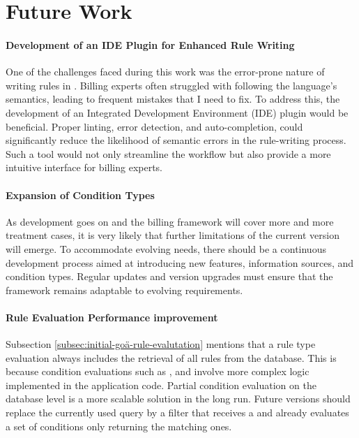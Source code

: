 \section{Future Work}\label{sec:future-work}

\paragraph{Development of an IDE Plugin for Enhanced Rule Writing}
One of the challenges faced during this work was the error-prone nature of writing rules in \RF.
Billing experts often struggled with following the language's semantics, leading to frequent mistakes that I need to fix.
To address this, the development of an Integrated Development Environment (IDE) plugin would be beneficial.
Proper linting, error detection, and  auto-completion, could significantly reduce the likelihood of semantic errors
in the rule-writing process.
Such a tool would not only streamline the workflow but also provide a more intuitive interface for billing experts.

\paragraph{Expansion of Condition Types}
As development goes on and the billing framework will cover more and more treatment cases,
it is very likely that further limitations of the current version will emerge.
To accommodate evolving needs, there should be a continuous development process aimed at introducing new features,
information sources, and condition types.
Regular updates and version upgrades must ensure that the framework remains adaptable to evolving requirements.

\paragraph{Rule Evaluation Performance improvement}
Subsection \ref{subsec:initial-goä-rule-evalutation} mentions that a rule type evaluation always includes the retrieval of all rules from the database.
This is because condition evaluations such as \anamnesisBlocks, \physicalBlocks and \requiredIcdCodes involve more complex logic implemented in the application code.
Partial condition evaluation on the database level is a more scalable solution in the long run.
Future versions should replace the currently used  query by a filter that receives a \REI and already evaluates a set of conditions only returning the matching ones.

